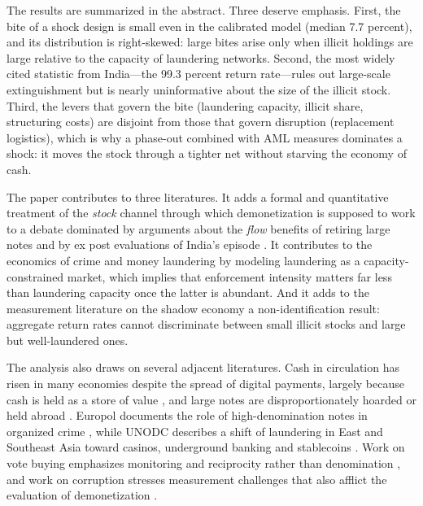 \documentclass[11pt]{article}
\theoremstyle{definition}
\theoremstyle{remark}
\begin{document}
The results are summarized in the abstract. Three deserve emphasis. First, the bite of a shock design is small even in
the calibrated model (median 7.7 percent), and its distribution is right-skewed: large bites arise only when illicit
holdings are large relative to the capacity of laundering networks. Second, the most widely cited statistic from
India---the 99.3 percent return rate---rules out large-scale extinguishment but is nearly uninformative about the size of
the illicit stock. Third, the levers that govern the bite (laundering capacity, illicit share, structuring costs) are
disjoint from those that govern disruption (replacement logistics), which is why a phase-out combined with AML measures
dominates a shock: it moves the stock through a tighter net without starving the economy of cash.

The paper contributes to three literatures. It adds a formal and quantitative treatment of the \textit{stock} channel
through which demonetization is supposed to work to a debate dominated by arguments about the \textit{flow} benefits of
retiring large notes \citep{rogoff1998,rogoff2016,sands2016} and by ex post evaluations of India's episode
\citep{chodorowreich2020,lahiri2020,crouzet2023}. It contributes to the economics of crime and money laundering
\citep{becker1968,unger2007} by modeling laundering as a capacity-constrained market, which implies that enforcement
intensity matters far less than laundering capacity once the latter is abundant. And it adds to the measurement
literature on the shadow economy \citep{tanzi1983,schneider2000,medina2018} a non-identification result: aggregate return
rates cannot discriminate between small illicit stocks and large but well-laundered ones.

The analysis also draws on several adjacent literatures. Cash in circulation has risen in many economies despite the
spread of digital payments, largely because cash is held as a store of value \citep{bech2018,jobst2017}, and large notes
are disproportionately hoarded or held abroad \citep{rogoff1998}. Europol documents the role of high-denomination notes in
organized crime \citep{europol2015}, while UNODC describes a shift of laundering in East and Southeast Asia toward casinos,
underground banking and stablecoins \citep{unodc2024}. Work on vote buying emphasizes monitoring and reciprocity rather
than denomination \citep{stokes2005,vicente2014}, and work on corruption stresses measurement challenges that also afflict
the evaluation of demonetization \citep{olken2012}.
\end{document}
